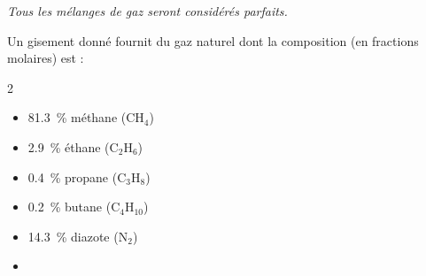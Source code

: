 


\finEntrainement




 




\bigskip

{\itshape Tous les mélanges de gaz seront considérés parfaits.}

\hauteurLargeurCadreReponse			{6mm}{2cm}
\initialisationEntrainement

Un gisement donné %
fournit du gaz naturel dont la composition (en fractions molaires) est :
\begin{center}
\begin{minipage}{0.7\textwidth}
\begin{multicols}{2}
\begin{itemize}
\item
\SI{81,3}{\percent}  méthane ($\mathrm{CH_4}$)
\item
\SI{2,9}{\percent}  éthane ($\mathrm{C_2H_6}$)
\item
\SI{0,4}{\percent}  propane ($\mathrm{C_3H_8}$)
\end{itemize}
\begin{itemize}
\item
\SI{0,2}{\percent}  butane ($\mathrm{C_4H_{10}}$)
\item
\SI{14,3}{\percent}  diazote ($\mathrm{N_2}$)
\item[]
\end{itemize}
\end{multicols}
\end{minipage}
\end{center}


